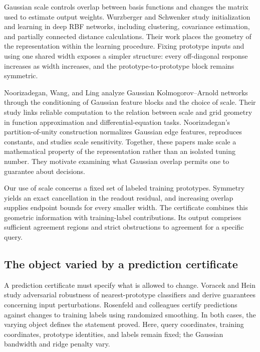 \documentclass[preprint,12pt,authoryear]{elsarticle}
\begin{document}
Gaussian scale controls overlap between basis functions and changes the matrix used to estimate output weights. Wurzberger and Schwenker \citeyearpar{wurzberger2024} study initialization and learning in deep RBF networks, including clustering, covariance estimation, and partially connected distance calculations. Their work places the geometry of the representation within the learning procedure. Fixing prototype inputs and using one shared width exposes a simpler structure: every off-diagonal response increases as width increases, and the prototype-to-prototype block remains symmetric.

Noorizadegan, Wang, and Ling \citeyearpar{noorizadegan2026reliable} analyze Gaussian Kolmogorov--Arnold networks through the conditioning of Gaussian feature blocks and the choice of scale. Their study links reliable computation to the relation between scale and grid geometry in function approximation and differential-equation tasks. Noorizadegan's \citeyearpar{noorizadegan2026partition} partition-of-unity construction normalizes Gaussian edge features, reproduces constants, and studies scale sensitivity. Together, these papers make scale a mathematical property of the representation rather than an isolated tuning number. They motivate examining what Gaussian overlap permits one to guarantee about decisions.

Our use of scale concerns a fixed set of labeled training prototypes. Symmetry yields an exact cancellation in the readout residual, and increasing overlap supplies endpoint bounds for every smaller width. The certificate combines this geometric information with training-label contributions. Its output comprises sufficient agreement regions and strict obstructions to agreement for a specific query.

\subsection{The object varied by a prediction certificate}
A prediction certificate must specify what is allowed to change. Voracek and Hein \citeyearpar{voracek2022} study adversarial robustness of nearest-prototype classifiers and derive guarantees concerning input perturbations. Rosenfeld and colleagues \citeyearpar{rosenfeld2020} certify predictions against changes to training labels using randomized smoothing. In both cases, the varying object defines the statement proved. Here, query coordinates, training coordinates, prototype identities, and labels remain fixed; the Gaussian bandwidth and ridge penalty vary.
\end{document}
